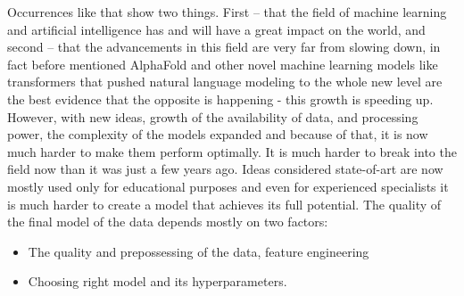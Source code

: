 \documentclass[a4paper,twoside,12pt]{book}
\begin{document}
\newline
Occurrences like that show two things. First -- that the field of machine learning and artificial intelligence has and will have a great impact on the world, and second -- that the advancements in this field are very far from slowing down, in fact before mentioned AlphaFold and other novel machine learning models like transformers that pushed natural language modeling to the whole new level are the best evidence that the opposite is happening - this growth is speeding up.
\newline
However, with new ideas, growth of the availability of data, and processing power, the complexity of the models expanded and because of that, it is now much harder to make them perform optimally. It is much harder to break into the field now than it was just a few years ago. Ideas considered state-of-art are now mostly used only for educational purposes and even for experienced specialists it is much harder to create a model that achieves its full potential. The quality of the final model of the data depends mostly on two factors: 
\begin{itemize}
\item The quality and prepossessing of the data, feature engineering
\item Choosing right model and its hyperparameters.
\end{itemize}
\end{document}
